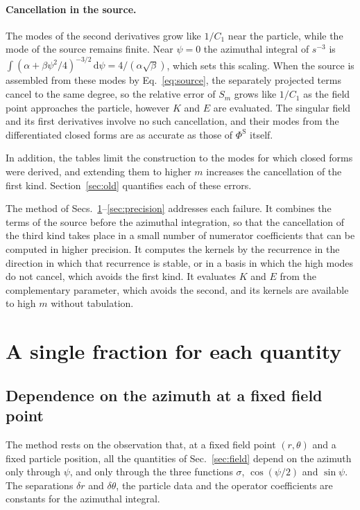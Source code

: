 \documentclass[11pt]{article}
\newcommand{\dd}{\mathrm{d}}
\newcommand{\PhiS}{\Phi^{\mathrm{S}}}
\begin{document}
\paragraph{Cancellation in the source.} The modes of the second derivatives
grow like $1/C_1$ near the particle, while the mode of the source remains
finite. Near $\psi=0$ the azimuthal integral of $s^{-3}$ is
$\int(\alpha+\beta\psi^2/4)^{-3/2}\,\dd\psi=4/(\alpha\sqrt\beta)$, which sets
this scaling. When the source is assembled from these modes by
Eq.~\eqref{eq:source}, the separately projected terms cancel to the same
degree, so the relative error of $S_m$ grows like $1/C_1$ as the field point
approaches the particle, however $K$ and $E$ are evaluated. The singular field
and its first derivatives involve no such cancellation, and their modes from the
differentiated closed forms are as accurate as those of $\PhiS$ itself.

In addition, the tables limit the construction to the modes for which closed
forms were derived, and extending them to higher $m$ increases the
cancellation of the first kind. Section~\ref{sec:old} quantifies each of these
errors.

The method of Secs.~\ref{sec:rational}--\ref{sec:precision} addresses each
failure. It combines the terms of the source before the azimuthal integration,
so that the cancellation of the third kind takes place in a small number of
numerator coefficients that can be computed in higher precision. It computes
the kernels by the recurrence in the direction in which that recurrence is
stable, or in a basis in which the high modes do not cancel, which avoids the
first kind. It evaluates $K$ and $E$ from the complementary parameter, which
avoids the second, and its kernels are available to high $m$ without
tabulation.

\section{A single fraction for each quantity}
\label{sec:rational}

\subsection{Dependence on the azimuth at a fixed field point}

The method rests on the observation that, at a fixed field point $(r,\theta)$
and a fixed particle position, all the quantities of Sec.~\ref{sec:field}
depend on the azimuth only through $\psi$, and only through the three
functions $\sigma$, $\cos(\psi/2)$ and $\sin\psi$. The separations $\delta r$
and $\delta\theta$, the particle data and the operator coefficients are
constants for the azimuthal integral.
\end{document}

